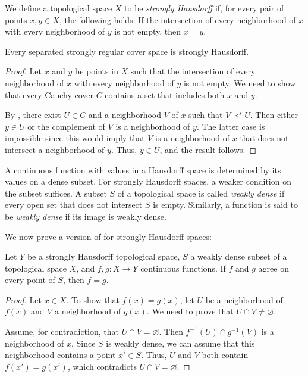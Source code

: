 \documentclass[pdflatex,sn-mathphys-num]{sn-jnl}
\theoremstyle{definition}
\theoremstyle{remark}
\numberwithin{figure}{section}
\newcommand{\rb}{\prec}
\begin{document}
We define a topological space $X$ to be \emph{strongly Hausdorff} if, for every pair of points $x,y \in X$, the following holds:
If the intersection of every neighborhood of $x$ with every neighborhood of $y$ is not empty, then $x = y$.

\begin{lem}
Every separated strongly regular cover space is strongly Hausdorff.
\end{lem}
\begin{proof}
Let $x$ and $y$ be points in $X$ such that the intersection of every neighborhood of $x$ with every neighborhood of $y$ is not empty.
We need to show that every Cauchy cover $C$ contains a set that includes both $x$ and $y$. 

By , there exist $U \in C$ and a neighborhood $V$ of $x$ such that $V \rb^s U$.
Then either $y \in U$ or the complement of $V$ is a neighborhood of $y$.
The latter case is impossible since this would imply that $V$ is a neighborhood of $x$ that does not intersect a neighborhood of $y$.
Thus, $y \in U$, and the result follows.
\end{proof}

A continuous function with values in a Hausdorff space is determined by its values on a dense subset.
For strongly Hausdorff spaces, a weaker condition on the subset suffices.
A subset $S$ of a topological space is called \emph{weakly dense} if every open set that does not intersect $S$ is empty.
Similarly, a function is said to be \emph{weakly dense} if its image is weakly dense. 

We now prove a version of  for strongly Hausdorff spaces:

\begin{prop}
Let $Y$ be a strongly Hausdorff topological space, $S$ a weakly dense subset of a topological space $X$, and $f,g : X \to Y$ continuous functions.
If $f$ and $g$ agree on every point of $S$, then $f = g$.
\end{prop}
\begin{proof}
Let $x \in X$.
To show that $f(x) = g(x)$, let $U$ be a neighborhood of $f(x)$ and $V$ a neighborhood of $g(x)$.
We need to prove that $U \cap V \neq \varnothing$. 

Assume, for contradiction, that $U \cap V = \varnothing$.
Then $f^{-1}(U) \cap g^{-1}(V)$ is a neighborhood of $x$.
Since $S$ is weakly dense, we can assume that this neighborhood contains a point $x' \in S$.
Thus, $U$ and $V$ both contain $f(x') = g(x')$, which contradicts $U \cap V = \varnothing$.
\end{proof}
\end{document}
